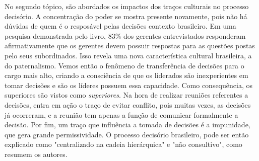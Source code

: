 \documentclass[11pt, a4paper]{article}
\begin{document}
No segundo tópico, são abordados os impactos dos traços culturais no processo decisório. A concentração do poder se mostra presente novamente, pois não há dúvidas de quem é o resposável pelas decisões contexto brasileiro. Em uma pesquisa demonstrada pelo livro, 83\% dos gerentes entrevistados responderam afirmativamente que os gerentes devem possuir respostas para as questões postas pelo seus subordinados. Isso revela uma nova característica cultural brasileira, a do paternalismo. Vemos então o fenômeno de transferência de decisões para o cargo mais alto, criando a consciência de que os liderados são inexperientes em tomar decisões e são os líderes possuem essa capacidade. Como consequência, os superiores são vistos como \emph{superiores}. Na hora de realizar reuniões referentes a decisões, entra em ação o traço de evitar conflito, pois muitas vezes, as decisões já ocorreram, e a reunião tem apenas a função de comunicar formalmente a decisão. Por fim, um traço que influência a tomada de decisões é a impunidade, que gera grande permissividade. O processo decisório brasileiro, pode ser então explicado como "centralizado na cadeia hierárquica" e "não consultivo", como resumem os autores.
\end{document}
